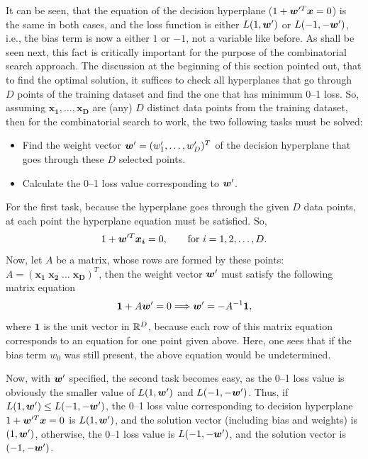 It can be seen, that the equation of the decision hyperplane ($1 + \boldsymbol{w}'^T \boldsymbol{x} = 0$) is the same in both cases, and the loss function is either $L(1, \boldsymbol{w}')$ or $L(-1, -\boldsymbol{w}')$, i.e., the bias term is now a either $1$ or $-1$, not a variable like before. As shall be seen next, this fact is critically important for the purpose of the combinatorial search approach. The discussion at the beginning of this section pointed out, that to find the optimal solution, it suffices to check all hyperplanes that go through $D$ points of the training dataset and find the one that has minimum 0--1 loss. So, assuming $\boldsymbol{x_1}, \dots, \boldsymbol{x_D}$ are (any) $D$ distinct data points from the training dataset, then for the combinatorial search to work, the two following tasks must be solved:
\begin{itemize}
\item Find the weight vector $\boldsymbol{w}'=(w'_1, \dots, w'_D)^T$ of the decision hyperplane that goes through these $D$ selected points. 
\item Calculate the 0--1 loss value corresponding to $\boldsymbol{w}'$.  
\end{itemize}

For the first task, because the hyperplane goes through the given $D$ data points, at each point the hyperplane equation must be satisfied. So, 
$$ 1+ \boldsymbol{w}'^T\boldsymbol{x_i} = 0, \quad\quad \text{for } i = 1, 2, \dots, D.$$
Now, let $A$ be a matrix, whose rows are formed by these points: 
$A =(\boldsymbol{x_1}\; \boldsymbol{x_2}\; \dots \; \boldsymbol{x_D})^T$,
then the weight vector $\boldsymbol{w}'$ must satisfy the following matrix equation 
\begin{equation}\label{eq:matrix}
\boldsymbol{1} + A \boldsymbol{w}' = 0 \Longrightarrow \boldsymbol{w}' = -A^{-1}\boldsymbol{1},
\end{equation}
where $\boldsymbol{1}$ is the unit vector in $\mathbb{R}^D$, because each row of this matrix equation corresponds to an equation for one point given above. Here, one sees that if the bias term $w_0$ was still present, the above equation would be undetermined. 

Now, with $\boldsymbol{w}'$ specified, the second task becomes easy, as the 0--1 loss value is obviously the smaller value of $L(1,\boldsymbol{w}')$ and $L(-1, -\boldsymbol{w}')$. Thus, if $L(1,\boldsymbol{w}') \leq L(-1,-\boldsymbol{w}')$, the 0--1 loss value corresponding to decision hyperplane $1+\boldsymbol{w}'^T\boldsymbol{x} = 0$ is $L(1,\boldsymbol{w}')$, and the solution vector (including bias and weights) is $(1, \boldsymbol{w}')$, otherwise, the 0--1 loss value is $L(-1,-\boldsymbol{w}')$, and the solution vector is $(-1,-\boldsymbol{w}')$.

